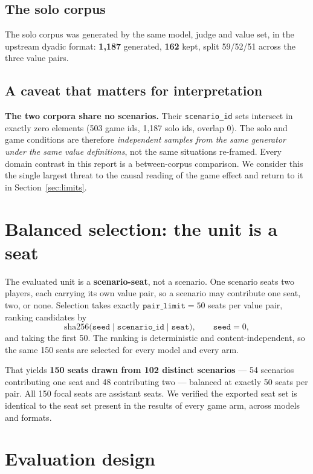 \documentclass[11pt]{article}
\begin{document}
\subsection{The solo corpus}

The solo corpus was generated by the same model, judge and value set, in the
upstream dyadic format: \textbf{1{,}187} generated, \textbf{162} kept, split
59/52/51 across the three value pairs.

\subsection{A caveat that matters for interpretation}

\textbf{The two corpora share no scenarios.} Their \texttt{scenario\_id} sets
intersect in exactly zero elements (503 game ids, 1{,}187 solo ids, overlap 0).
The solo and game conditions are therefore \emph{independent samples from the
same generator under the same value definitions}, not the same situations
re-framed. Every domain contrast in this report is a between-corpus comparison.
We consider this the single largest threat to the causal reading of the game
effect and return to it in Section~\ref{sec:limits}.

\section{Balanced selection: the unit is a seat}
\label{sec:selection}

The evaluated unit is a \textbf{scenario-seat}, not a scenario. One scenario
seats two players, each carrying its own value pair, so a scenario may
contribute one seat, two, or none. Selection takes exactly
$\texttt{pair\_limit} = 50$ seats per value pair, ranking candidates by
\[
  \mathrm{sha256}\bigl(\texttt{seed} \mid \texttt{scenario\_id} \mid \texttt{seat}\bigr),
  \qquad \texttt{seed} = 0,
\]
and taking the first 50. The ranking is deterministic and content-independent,
so the same 150 seats are selected for every model and every arm.

That yields \textbf{150 seats drawn from 102 distinct scenarios} --- 54
scenarios contributing one seat and 48 contributing two --- balanced at exactly
50 seats per pair. All 150 focal seats are assistant seats. We verified the
exported seat set is identical to the seat set present in the results of every
game arm, across models and formats.

\section{Evaluation design}
\end{document}
